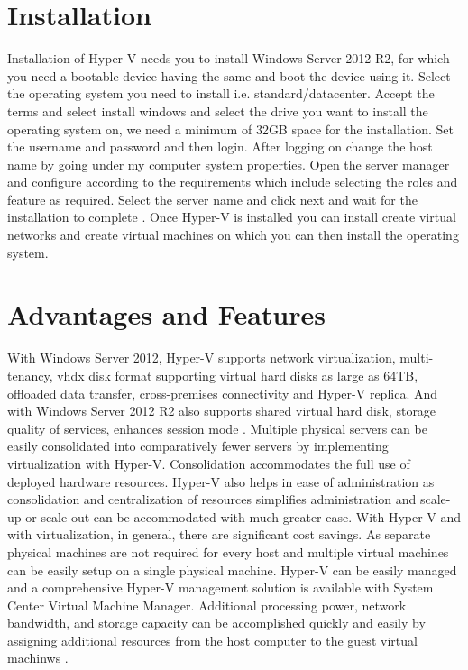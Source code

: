 \documentclass[9pt,twocolumn,twoside]{../../styles/osajnl}
\begin{document}
\section{Installation}

Installation of Hyper-V needs you to install Windows Server 2012 R2,
for which you need a bootable device having the same and boot the
device using it. Select the operating system you need to install
i.e. standard/datacenter.  Accept the terms and select install windows
and select the drive you want to install the operating system on, we
need a minimum of 32GB space for the installation. Set the username
and password and then login. After logging on change the host name by
going under my computer system properties. Open the server manager and
configure according to the requirements which include selecting the
roles and feature as required. Select the server name and click next
and wait for the installation to complete
\cite{www-hyperv-paper2}. Once Hyper-V is installed you can install
create virtual networks and create virtual machines on which you can
then install the operating system.

\section{Advantages and Features}

With Windows Server 2012, Hyper-V supports network virtualization,
multi-tenancy, vhdx disk format supporting virtual hard disks as
large as 64TB, offloaded data transfer, cross-premises connectivity
and Hyper-V replica. And with Windows Server 2012 R2 also supports
shared virtual hard disk, storage quality of services, enhances
session mode \cite{www-hyperv-wikipedia}. Multiple physical servers
can be easily consolidated into comparatively fewer servers by
implementing virtualization with Hyper-V. Consolidation accommodates
the full use of deployed hardware resources. Hyper-V also helps in
ease of administration as consolidation and centralization of
resources simplifies administration and scale-up or scale-out can be
accommodated with much greater ease. With Hyper-V and with
virtualization, in general, there are significant cost savings. As
separate physical machines are not required for every host and
multiple virtual machines can be easily setup on a single physical
machine. Hyper-V can be easily managed and a comprehensive Hyper-V
management solution is available with System Center Virtual Machine
Manager.  Additional processing power, network bandwidth, and storage
capacity can be accomplished quickly and easily by assigning
additional resources from the host computer to the guest virtual
machinws \cite{www-hyperv-advantages}.
\end{document}
